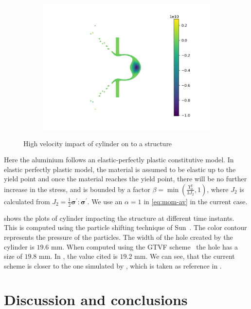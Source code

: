 \documentclass[preprint,12pt]{elsarticle}
\newcommand{\teng}[1]{\ensuremath{\boldsymbol{#1}}}
\begin{document}
\begin{figure}[!htpb]
\begin{subfigure}{0.3\textwidth}
    \includegraphics[width=1\linewidth]{fig_30_i}
    \label{}
  \end{subfigure}
  \caption{High velocity impact of cylinder on to a structure}
\label{fig:hvi:etvf-sun2019}
\end{figure}
Here the aluminium follows an elastic-perfectly plastic constitutive model. In
elastic perfectly plastic model, the material is assumed to be elastic up to
the yield point and once the material reaches the yield point, there will be
no further increase in the stress, and is bounded by a factor
$\beta = \min\left(\frac{Y_0^2}{3J_2}, 1 \right)$, where $J_2$ is calculated
from $J_2 = \frac{1}{2} \teng{\sigma}^{'} : \teng{\sigma}^{'}$. We use an
$\alpha=1$ in \cref{eq:mom-av} in the current case.

 shows the plots of cylinder impacting the
structure at different time instants. This is computed using the particle
shifting technique of Sun~\cite{sun_consistent_2019}. The color contour
represents the pressure of the particles. The width of the hole created by the
cylinder is $19.6$ mm. When computed using the GTVF
scheme~\cite{zhang_hu_adams17} the hole has a size of $19.8$ mm. In
\citet{howell2002free}, the value cited is $19.2$ mm. We can see, that the
current scheme is closer to the one simulated by \cite{howell2002free}, which
is taken as reference in \cite{zhang_hu_adams17}.


\section{Discussion and conclusions}
\end{document}

